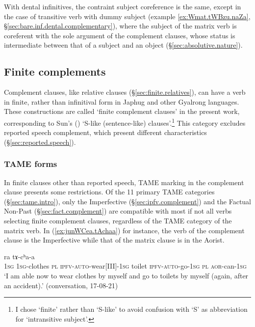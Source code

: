 With dental infinitives, the contraint subject coreference is the same, except in the case of transitive verb with dummy subject (example \ref{ex:Wmat.tWBzu.naZa}, §\ref{sec:bare.inf.dental.complementary}), where the subject of the matrix verb is coreferent with the sole argument of the complement clauses, whose status is intermediate between that of a subject and an object (§\ref{sec:absolutive.nature}).

 \subsection{Finite complements} \label{sec:finite.complement}
 Complement clauses, like relative clauses (§\ref{sec:finite.relatives}), can have a verb in finite, rather than infinitival form in Japhug and other Gyalrong languages. These constructions are called `finite complement clauses' in the present work, corresponding to Sun's (\citeyear[475-477]{sun12complementation})  `S-like (sentence-like) clauses'.\footnote{I chose `finite' rather than `S-like' to avoid confusion with `S' as abbreviation for  `intransitive subject'.   } This category excludes reported speech complement, which present different characteristics (§\ref{sec:reported.speech}).

 \subsubsection{TAME forms} \label{sec:TAM.finite}
In finite clauses other than reported speech, TAME marking in the complement clause presents some restrictions. Of the 11 primary TAME categories (§\ref{sec:tame.intro}), only the Imperfective (§\ref{sec:ipfv.complement}) and the Factual Non-Past (§\ref{sec:fact.complement}) are compatible with most if not all verbs selecting finite complement clauses, regardless of the TAME category of the matrix verb. In (\ref{ex:junWCea.tAchaa}) for instance, the verb of the complement clause is the Imperfective while that of the matrix clause is in the Aorist.

\begin{exe}
\ex \label{ex:junWCea.tAchaa}
  ra tɤ-cʰa-a \\
 \textsc{1sg} \textsc{1sg}-clothes \textsc{pl} \textsc{ipfv}-\textsc{auto}-wear[III]-\textsc{1sg} toilet \textsc{ipfv}-\textsc{auto}-go-\textsc{1sg} \textsc{pl} \textsc{aor}-can-\textsc{1sg} \\
 \glt  `I am able now to wear clothes by myself and go to toilets by myself (again, after an accident).' (conversation, 17-08-21)
 \end{exe}


